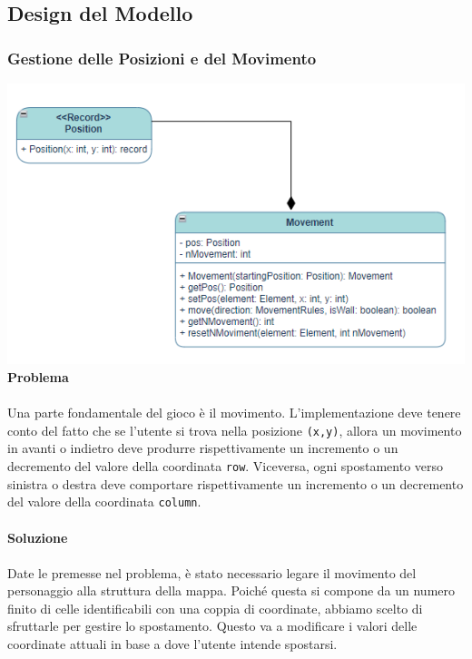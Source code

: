 \documentclass[12pt, letterpaper]{article}
\begin{document}
    \subsection{Design del Modello}
        \subsubsection{Gestione delle Posizioni e del Movimento}
            \includegraphics[width=1\textwidth]{moviment_position.png}\\
            \textbf{Problema}\\ \\
            Una parte fondamentale del gioco è il movimento.
            L'implementazione deve tenere conto del fatto che se l'utente si trova nella posizione \verb|(x,y)|, allora un movimento in avanti o indietro deve produrre rispettivamente un incremento o un decremento del valore della coordinata \verb|row|. Viceversa, ogni spostamento verso sinistra o destra deve comportare rispettivamente un incremento o un decremento del valore della coordinata \verb|column|.\\ \\
            \textbf{Soluzione}\\ \\
            Date le premesse nel problema, è stato necessario legare il movimento del personaggio alla struttura della mappa.
            Poiché questa si compone da un numero finito di celle identificabili con una coppia di coordinate, abbiamo scelto di sfruttarle per gestire lo spostamento. Questo va a modificare i valori delle coordinate attuali in base a dove l'utente intende spostarsi.
\end{document}
